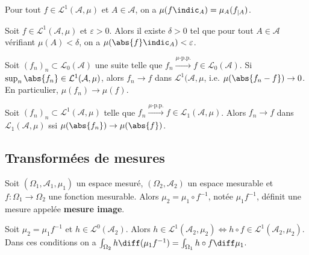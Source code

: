 	\begin{pop}
		Pour tout $f \in \mathcal{L}^1(\mathcal{A},\mu)$ et $A \in \mathcal{A}$, on a $\mu(f \indic_A) = \mu_A(f_{|A})$.
	\end{pop}
	
	\begin{lem}
		Soit $f \in \mathcal{L}^1(\mathcal{A},\mu)$ et $\varepsilon > 0$.
		Alors il existe $\delta > 0$ tel que pour tout $A \in \mathcal{A}$ vérifiant $\mu(A) < \delta$, on a $\mu(\abs{f} \indic_A) < \varepsilon$.
	\end{lem}
	
	\begin{thm}
		Soit $(f_n)_n \subset \mathcal{L}_0(\mathcal{A})$ une suite telle que $f_n \overset{\mu \text{-p.p.}}{\longrightarrow} f \in \mathcal{L}_0(\mathcal{A})$.
		Si $\sup_n \abs{f_n} \in \mathcal{L}^1(\mathcal{A},\mu)$, alors $f_n \to f$ dans $\mathcal{L}^1(\mathcal{A},\mu$, i.e. $\mu(\abs{f_n - f}) \to 0$.
		En particulier, $\mu(f_n) \to \mu(f)$.
	\end{thm}
	
	\begin{lem}
		Soit $(f_n)_n \subset \mathcal{L}^1(\mathcal{A},\mu)$ telle que $f_n \overset{\mu \text{-p.p.}}{\longrightarrow} f \in \mathcal{L}_1(\mathcal{A},\mu)$.
		Alors $f_n \to f$ dans $\mathcal{L}_1(\mathcal{A},\mu)$ ssi $\mu(\abs{f_n}) \to \mu(\abs{f})$.
	\end{lem}


\subsection{Transformées de mesures}

	\begin{defn}
		Soit $(\Omega_1, \mathcal{A}_1, \mu_1)$ un espace mesuré, $(\Omega_2, \mathcal{A}_2)$ un espace mesurable et $f \colon \Omega_1 \to \Omega_2$ une fonction mesurable.
		Alors $\mu_2 = \mu_1 \circ f^{-1}$, notée $\mu_1 f^{-1}$, définit une mesure appelée \textbf{mesure image}.
	\end{defn}

	\begin{thm}
		Soit $\mu_2 = \mu_1 f^{-1}$ et $h \in \mathcal{L}^0(\mathcal{A}_2)$.
		Alors $h \in \mathcal{L}^1(\mathcal{A}_2, \mu_2) \iff h \circ f \in \mathcal{L}^1(\mathcal{A}_2, \mu_2)$.
		Dans ces conditions on a $\int_{\Omega_2} h \diff(\mu_1 f^{-1}) = \int_{\Omega_1} h \circ f \diff \mu_1$.
	\end{thm}

